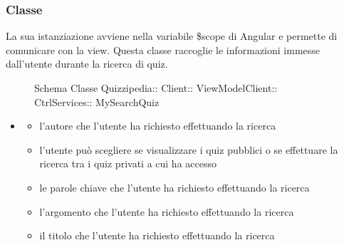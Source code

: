 \subsubsection{Classe }
La sua istanziazione avviene nella variabile \$scope di Angular e permette di comunicare con la view. Questa classe raccoglie le informazioni immesse dall'utente durante la ricerca di quiz.
\begin{figure}[H]
\centering
\noindent{}
\caption[Schema Classe MySearchQuiz]{Schema Classe Quizzipedia:: Client:: ViewModelClient:: CtrlServices:: MySearchQuiz}
\end{figure}
\begin{itemize}
\item {}
\begin{itemize}
\item {}
\newline
l'autore che l'utente ha richiesto effettuando la ricerca
\item {}
\newline
l'utente può scegliere se visualizzare i quiz pubblici o se effettuare la ricerca tra i quiz privati a cui ha accesso
\item {}
\newline
le parole chiave che l'utente ha richiesto effettuando la ricerca
\item {}
\newline
l'argomento che l'utente ha richiesto effettuando la ricerca
\item {}
\newline
il titolo che l'utente ha richiesto effettuando la ricerca
\end{itemize}
\end{itemize}
